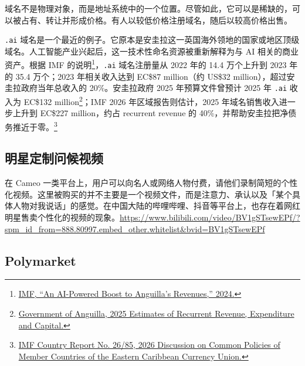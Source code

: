 \documentclass[UTF8,10pt,a4paper,scheme=chinese]{ctexart}
\begin{document}
域名不是物理对象，而是地址系统中的一个位置。尽管如此，它可以是稀缺的，可以被占有、转让并形成价格。有人以较低价格注册域名，随后以较高价格出售。

\texttt{.ai} 域名是一个最近的例子。它原本是安圭拉这一英国海外领地的国家或地区顶级域名。人工智能产业兴起后，这一技术性命名资源被重新解释为与 AI 相关的商业资产。根据 IMF 的说明\footnote{\href{https://www.imf.org/en/news/articles/2024/05/15/cf-an-ai-powered-boost-to-anguillas-revenues}{IMF, ``An AI-Powered Boost to Anguilla's Revenues,'' 2024.}}，\texttt{.ai} 域名注册量从 2022 年的 14.4 万个上升到 2023 年的 35.4 万个；2023 年相关收入达到 EC\$87 million（约 US\$32 million），超过安圭拉政府当年总收入的 20\%。安圭拉政府 2025 年预算文件曾预计 2025 年 \texttt{.ai} 收入为 EC\$132 million\footnote{\href{https://www.gov.ai/document/2026-03-18-011900_862974747.pdf}{Government of Anguilla, 2025 Estimates of Recurrent Revenue, Expenditure and Capital.}}；IMF 2026 年区域报告则估计，2025 年域名销售收入进一步上升到 EC\$227 million，约占 recurrent revenue 的 40\%，并帮助安圭拉把净债务推近于零。\footnote{\href{https://www.imf.org/-/media/files/publications/cr/2026/english/1eccea2026001-source-pdf.pdf}{IMF Country Report No. 26/85, 2026 Discussion on Common Policies of Member Countries of the Eastern Caribbean Currency Union.}}


\subsection{明星定制问候视频}

在 Cameo 一类平台上，用户可以向名人或网络人物付费，请他们录制简短的个性化视频。这里被购买的并不主要是一个视频文件，而是注意力、承认以及「某个具体人物对我说话」的感觉。在中国大陆的哔哩哔哩、抖音等平台上，也存在着网红明星售卖个性化的视频的现象。\url{https://www.bilibili.com/video/BV1gSTsewEPf/?spm_id_from=888.80997.embed_other.whitelist&bvid=BV1gSTsewEPf}

\subsection{Polymarket}
\end{document}
